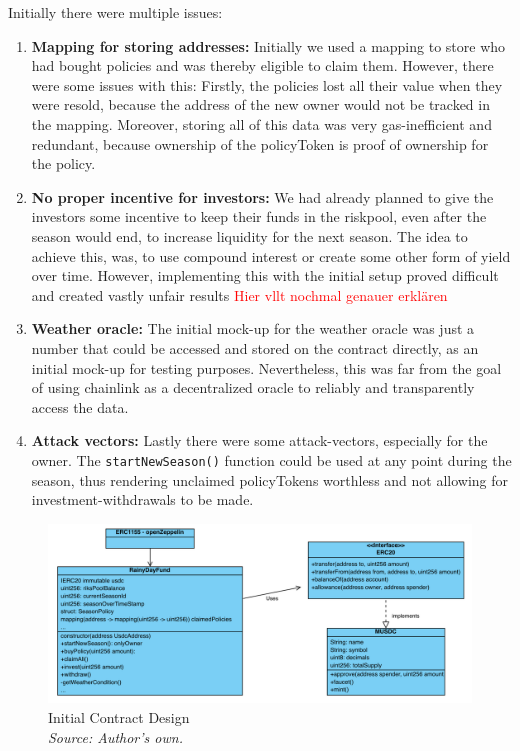 \documentclass[11pt,a4paper]{article}
\begin{document}
	Initially there were multiple issues:
	\begin{enumerate}[1]
		\item \textbf{Mapping for storing addresses:} Initially we used a mapping to store who had bought policies and was thereby eligible to claim them.
			However, there were some issues with this: Firstly, the policies lost all their value when they were resold, because the address of the new owner would not be tracked in the mapping.
			Moreover, storing all of this data was very gas-inefficient and redundant, because ownership of the policyToken is proof of ownership for the policy.
		\item \textbf{No proper incentive for investors:} We had already planned to give the investors some incentive to keep their funds in the riskpool, even after the season would end, to increase liquidity for the next season.
			The idea to achieve this, was, to use compound interest or create some other form of yield over time.
			However, implementing this with the initial setup proved difficult and created vastly unfair results \textcolor{red}{Hier vllt nochmal genauer erkl\"aren}
		\item \textbf{Weather oracle:} The initial mock-up for the weather oracle was just a number that could be accessed and stored on the contract directly, as an initial mock-up for testing purposes.
			Nevertheless, this was far from the goal of using chainlink as a decentralized oracle to reliably and transparently access the data.
		\item \textbf{Attack vectors:} Lastly there were some attack-vectors, especially for the owner.
			The \texttt{startNewSeason()} function could be used at any point during the season, thus rendering unclaimed policyTokens worthless and not allowing for investment-withdrawals to be made.
	\end{enumerate}

	\begin{figure}[H]
		\centering
		\includegraphics[scale=0.5]{graphics/ClassDiagram_Old}
		\caption{Initial Contract Design \\ \textit{Source: Author's own.}}
		\label{fig:initial-contract-design}
	\end{figure}
\end{document}
